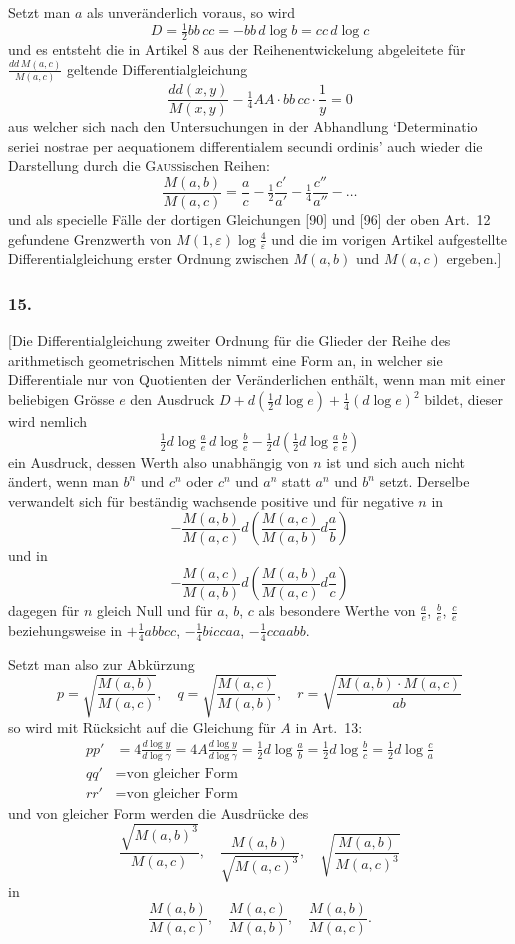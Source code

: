 \documentclass[12pt,a4paper]{article}
\begin{document}
Setzt man $a$ als unver\"anderlich voraus, so wird
\[
D = \tfrac{1}{2}bb\,cc = -bb\,d\log b = cc\,d\log c
\]
und es entsteht die in Artikel 8 aus der Reihenentwickelung abgeleitete f\"ur $\frac{dd\,M(a,c)}{M(a,c)}$ geltende Differentialgleichung
\[
\frac{dd(x,y)}{M(x,y)} - \tfrac{1}{4}AA\cdot bb\,cc\cdot\frac{1}{y} = 0
\]
aus welcher sich nach den Untersuchungen in der Abhandlung `Determinatio seriei nostrae per aequationem differentialem secundi ordinis' auch wieder die Darstellung durch die \textsc{Gauss}ischen Reihen:
\[
\frac{M(a,b)}{M(a,c)} = \frac{a}{c} - \tfrac{1}{2}\frac{c'}{a'} - \tfrac{1}{4}\frac{c''}{a''} - \dots
\]
und als specielle F\"alle der dortigen Gleichungen [90] und [96] der oben Art.\ 12 gefundene Grenzwerth von $M(1,\varepsilon)\log\frac{4}{\varepsilon}$ und die im vorigen Artikel aufgestellte Differentialgleichung erster Ordnung zwischen $M(a,b)$ und $M(a,c)$ ergeben.]

\subsubsection*{15.}

[Die Differentialgleichung zweiter Ordnung f\"ur die Glieder der Reihe des arithmetisch geometrischen Mittels nimmt eine Form an, in welcher sie Differentiale nur von Quotienten der Ver\"anderlichen enth\"alt, wenn man mit einer beliebigen Gr\"osse $e$ den Ausdruck $D + d(\tfrac{1}{2}d\log e) + \tfrac{1}{4}(d\log e)^2$ bildet, dieser wird nemlich
\[
\tfrac{1}{2}d\log\tfrac{a}{e}\,d\log\tfrac{b}{e} - \tfrac{1}{2}d(\tfrac{1}{2}d\log\tfrac{a}{e}\,\tfrac{b}{e})
\]
ein Ausdruck, dessen Werth also unabh\"angig von $n$ ist und sich auch nicht \"andert, wenn man $b^n$ und $c^n$ oder $c^n$ und $a^n$ statt $a^n$ und $b^n$ setzt. Derselbe verwandelt sich f\"ur best\"andig wachsende positive und f\"ur negative $n$ in
\[
-\frac{M(a,b)}{M(a,c)}d\left(\frac{M(a,c)}{M(a,b)}d\frac{a}{b}\right)
\]
und in
\[
-\frac{M(a,c)}{M(a,b)}d\left(\frac{M(a,b)}{M(a,c)}d\frac{a}{c}\right)
\]
dagegen f\"ur $n$ gleich Null und f\"ur $a$, $b$, $c$ als besondere Werthe von $\frac{a}{e}$, $\frac{b}{e}$, $\frac{c}{e}$ beziehungsweise in $+\tfrac{1}{4}abbcc$, $-\tfrac{1}{4}biccaa$, $-\tfrac{1}{4}ccaabb$.

Setzt man also zur Abk\"urzung
\[
p = \sqrt{\frac{M(a,b)}{M(a,c)}}, \quad q = \sqrt{\frac{M(a,c)}{M(a,b)}}, \quad r = \sqrt{\frac{M(a,b)\cdot M(a,c)}{ab}}
\]
so wird mit R\"ucksicht auf die Gleichung f\"ur $A$ in Art.\ 13:
\[
\begin{aligned}
pp' &= 4\frac{d\log y}{d\log\gamma} = 4A\frac{d\log y}{d\log\gamma} = \tfrac{1}{2}d\log\tfrac{a}{b} = \tfrac{1}{2}d\log\tfrac{b}{c} = \tfrac{1}{2}d\log\tfrac{c}{a} \\
qq' &= \text{von gleicher Form} \\
rr' &= \text{von gleicher Form}
\end{aligned}
\]
und von gleicher Form werden die Ausdr\"ucke des
\[
\frac{\sqrt{M(a,b)^3}}{M(a,c)}, \quad \frac{M(a,b)}{\sqrt{M(a,c)^3}}, \quad \sqrt{\frac{M(a,b)}{M(a,c)^3}}
\]
in
\[
\frac{M(a,b)}{M(a,c)}, \quad \frac{M(a,c)}{M(a,b)}, \quad \frac{M(a,b)}{M(a,c)}.
\]
\end{document}
